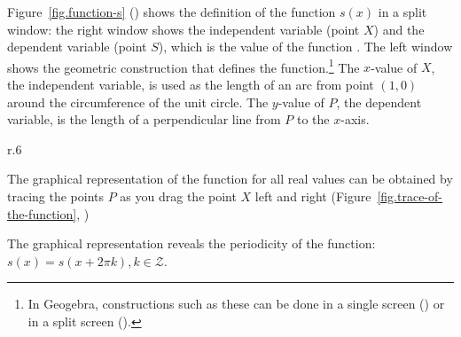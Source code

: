 Figure~\ref{fig.function-s} () shows the definition of the function $s(x)$ in a split window: the right window shows the independent variable (point $X$) and the dependent variable (point $S$), which is the value of the function . The left window shows the geometric construction that defines the function.\footnote{In Geogebra, constructions such as these can be done in a single screen () or in a split screen ().}
The $x$-value of $X$, the independent variable, is used as the length of an arc from point $(1,0)$ around the circumference of the unit circle.
The $y$-value of $P$, the dependent variable, is the length of a perpendicular line from $P$ to the $x$-axis.


\begin{wrapfigure}[8]{r}{.6\textwidth}
\begin{center}
\vspace{-5ex}
\caption{Trace of the function $s$}\label{fig.trace-of-the-function}
\end{center}
\end{wrapfigure}

The graphical representation of the function for all real values can be obtained by tracing the points $P$ as you drag the point $X$ left and right (Figure~\ref{fig.trace-of-the-function}, )

The graphical representation reveals the periodicity of the function: $s(x) = s(x + 2\pi k), k\in \mathcal{Z}$.

